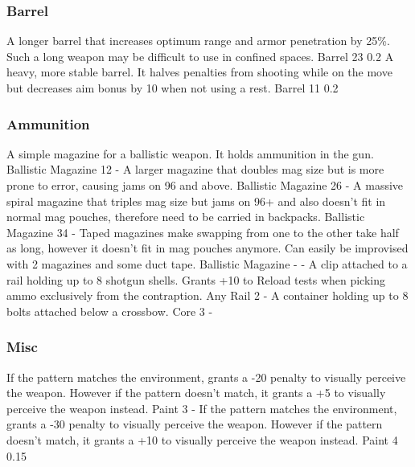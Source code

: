 \subsubsection{Barrel}
\vspace{8mm}
\begin{multicols}{2}
    {A longer barrel that increases optimum range and armor penetration by 25\%.
        Such a long weapon may be difficult to use in confined spaces.}
    {Barrel}
    {23}
    {0.2}
    {A heavy, more stable barrel.
        It halves penalties from shooting while on the move
        but decreases aim bonus by 10 when not using a rest.}
    {Barrel}
    {11}
    {0.2}
\end{multicols}

\subsubsection{Ammunition}
\vspace{8mm}
\begin{multicols}{2}
    {A simple magazine for a ballistic weapon.
        It holds ammunition in the gun.}
    {Ballistic Magazine}
    {12}
    {-}
    {A larger magazine that doubles mag size but is more prone to error,
        causing jams on 96 and above.}
    {Ballistic Magazine}
    {26}
    {-}
    {A massive spiral magazine that triples mag size
        but jams on 96+ and also doesn't fit in normal mag pouches,
        therefore need to be carried in backpacks.}
    {Ballistic Magazine}
    {34}
    {-}
    {Taped magazines make swapping from one to the other take half as long,
        however it doesn't fit in mag pouches anymore.
        Can easily be improvised with 2 magazines and some duct tape.}
    {Ballistic Magazine}
    {-}
    {-}
    {A clip attached to a rail holding up to 8 shotgun shells.
        Grants +10 to Reload tests when picking ammo exclusively from the contraption.}
    {Any Rail}
    {2}
    {-}
    {A container holding up to 8 bolts attached below a crossbow.}
    {Core}
    {3}
    {-}
\end{multicols}

\subsubsection{Misc}
\vspace{8mm}
\begin{multicols}{2}
    {If the pattern matches the environment,
        grants a -20 penalty to visually perceive the weapon.
        However if the pattern doesn't match,
        it grants a +5 to visually perceive the weapon instead.}
    {Paint}
    {3}
    {-}
    {If the pattern matches the environment,
        grants a -30 penalty to visually perceive the weapon.
        However if the pattern doesn't match,
        it grants a +10 to visually perceive the weapon instead.}
    {Paint}
    {4}
    {0.15}
\end{multicols}

